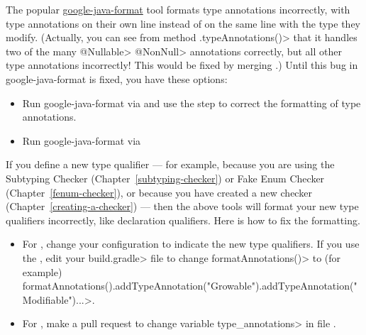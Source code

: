 The popular
\href{https://github.com/google/google-java-format}{google-java-format}
tool formats type annotations incorrectly, with type annotations on their
own line instead of on the same line with the type they modify.  (Actually,
you can see from method \<.typeAnnotations()> that
it handles two of the many \<@Nullable> \<@NonNull> annotations correctly,
but all other type annotations incorrectly!  This would be fixed by merging
.)
Until this bug in google-java-format is fixed, you have these options:
\begin{itemize}
\item
  Run google-java-format via
   and use the
  step to correct the formatting of type annotations.
\item
  Run google-java-format via 
\end{itemize}

If you define a new type qualifier --- for example, because you are using the
Subtyping Checker (Chapter~\ref{subtyping-checker}) or Fake Enum Checker
(Chapter~\ref{fenum-checker}), or because you have created a new checker
(Chapter~\ref{creating-a-checker}) --- then the above tools will format
your new type qualifiers incorrectly, like declaration qualifiers.  Here is
how to fix the formatting.

\begin{itemize}
\item
  For , change your
  configuration to indicate the new type qualifiers.  If you use the
  , edit your \<build.gradle> file to change
  \<formatAnnotations()> to (for example)
  \<formatAnnotations().addTypeAnnotation("Growable").addTypeAnnotation("Modifiable")...>.
\item
  For
  ,
  make a pull request to change variable \<type\_annotations> in file
  .
\end{itemize}


